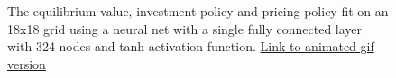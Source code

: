 \documentclass[12pt]{article}
\begin{document}
\begin{figure}[H]
  \centering
  \caption{The equilibrium value, investment policy and pricing policy fit on an 18x18 grid using a neural net with a single fully connected layer with 324 nodes and tanh activation function. \href{https://github.com/wmjones/VFA-for-dynamic-games/blob/master/gif_ann_18.gif}{Link to animated gif version}}
\end{figure}
\end{document}
